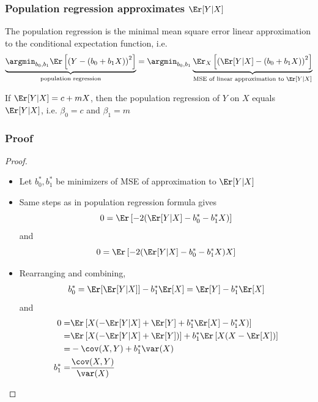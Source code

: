 \begin{frame}\frametitle{Population regression approximates
    $\Er[Y|X]$}
  \begin{lemma} \label{lem:regapprox}
    The population regression is the minimal mean square error linear
    approximation to the conditional expectation function, i.e.\
    {\footnotesize{
        \begin{align*}
      \underbrace{\argmin_{b_0, b_1} \Er\left[\left(Y-(b_0 + b_1
          X) \right)^2\right]}_{\text{population regression}} =
      \argmin_{b_0, b_1} \underbrace{\Er_X\left[\left(\Er[Y|X] - (b_0 + b_1
          X)\right)^2\right]}_{\text{MSE of linear approximation to $\Er[Y|X]$}}
    \end{align*}
  }}
  \end{lemma}
  
  \begin{corollary} 
    If $\Er[Y|X] = c + m X$, then the population regression of $Y$ on
    $X$ equals $\Er[Y|X]$, i.e. $\beta_0 = c$ and $\beta_1 = m$
  \end{corollary}
\end{frame}

\begin{frame}[shrink]\frametitle{Proof}
  \begin{proof}
    \begin{itemize}
    \item Let $b^*_0, b^*_1$ be minimizers of MSE of approximation to $\Er[Y|X]$
    \item Same steps as in population regression formula gives
      \[ 0 = \Er\left[ -2(\Er[Y|X] - b^*_0 - b^*_1 X) \right]  \]
      and
      \[ 0 = \Er\left[ -2(\Er[Y|X] - b^*_0 - b^*_1 X)X \right]  \]
    \item Rearranging and combining,
      \begin{align*}
        b_0^* = \Er[\Er[Y|X]] - b_1^* \Er[X] = \Er[Y] - b_1^* \Er[X]
      \end{align*}
      and
      \begin{align*}
        0 = & \Er\left[ X(-\Er[Y|X] + \Er[Y] + b^*_1 \Er[X] - b^*_1 X) \right] \\
        = & \Er\left[X(-\Er[Y|X] + \Er[Y])\right] + b^*_1\Er\left[X(X -
          \Er[X])\right] \\
        = & -\cov(X,Y) + b^*_1 \var(X) \\
        b^*_1 = & \frac{\cov(X,Y)}{\var(X)}      
      \end{align*}
    \end{itemize}
  \end{proof}
\end{frame}

